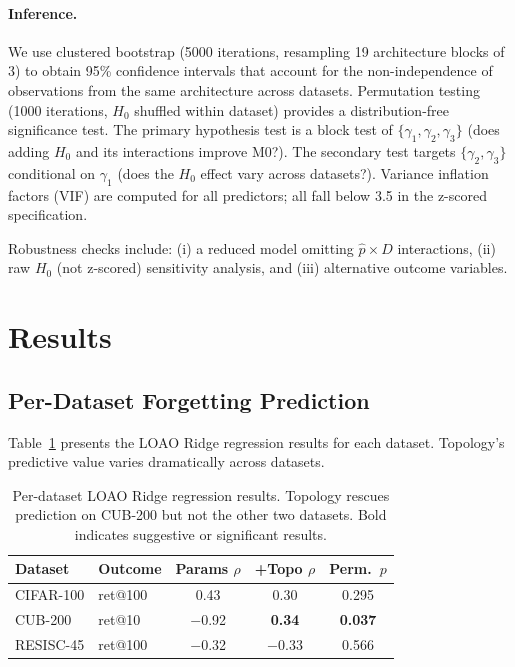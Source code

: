 \documentclass[10pt,twocolumn]{article}
\begin{document}
\paragraph{Inference.}
We use clustered bootstrap (5000 iterations, resampling 19 architecture blocks of 3) to obtain 95\% confidence intervals that account for the non-independence of observations from the same architecture across datasets. Permutation testing (1000 iterations, $H_0$ shuffled within dataset) provides a distribution-free significance test. The primary hypothesis test is a block test of $\{\gamma_1, \gamma_2, \gamma_3\}$ (does adding $H_0$ and its interactions improve M0?). The secondary test targets $\{\gamma_2, \gamma_3\}$ conditional on $\gamma_1$ (does the $H_0$ effect vary across datasets?). Variance inflation factors (VIF) are computed for all predictors; all fall below 3.5 in the z-scored specification.

Robustness checks include: (i) a reduced model omitting $\hat{p} \times D$ interactions, (ii) raw $H_0$ (not z-scored) sensitivity analysis, and (iii) alternative outcome variables.

\section{Results}
\label{sec:results}

\subsection{Per-Dataset Forgetting Prediction}

Table~\ref{tab:perdataset} presents the LOAO Ridge regression results for each dataset. Topology's predictive value varies dramatically across datasets.

\begin{table}[t]
\centering
\caption{Per-dataset LOAO Ridge regression results. Topology rescues prediction on CUB-200 but not the other two datasets. Bold indicates suggestive or significant results.}
\label{tab:perdataset}
\small
\setlength{\tabcolsep}{3pt}
\begin{tabular}{@{}llccc@{}}
\toprule
Dataset & Outcome & Params $\rho$ & +Topo $\rho$ & Perm.\ $p$ \\
\midrule
CIFAR-100  & ret@100 & 0.43  & 0.30  & 0.295 \\
CUB-200    & ret@10  & $-$0.92 & \textbf{0.34} & \textbf{0.037} \\
RESISC-45  & ret@100 & $-$0.32 & $-$0.33 & 0.566 \\
\bottomrule
\end{tabular}
\end{table}
\end{document}
